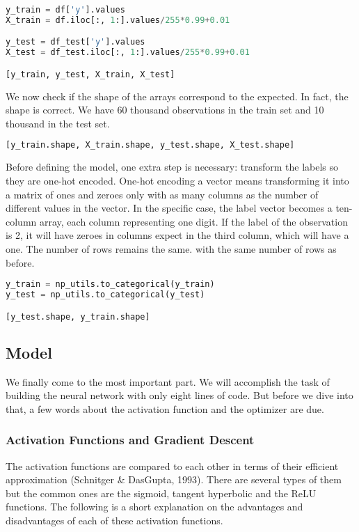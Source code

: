 \begin{lstlisting}[language=Python]
y_train = df['y'].values
X_train = df.iloc[:, 1:].values/255*0.99+0.01

y_test = df_test['y'].values
X_test = df_test.iloc[:, 1:].values/255*0.99+0.01

[y_train, y_test, X_train, X_test]
\end{lstlisting}

We now check if the shape of the arrays correspond to the expected. In fact, the shape is correct. We have 60 thousand observations in the train set and 10 thousand in the test set.

\begin{lstlisting}[language=Python]
[y_train.shape, X_train.shape, y_test.shape, X_test.shape]
\end{lstlisting}

Before defining the model, one extra step is necessary: transform the labels so they are one-hot encoded. One-hot encoding a vector means transforming it into a matrix of ones and zeroes only with as many columns as the number of different values in the vector. In the specific case, the label vector becomes a ten-column array, each column representing one digit. If the label of the observation is 2, it will have zeroes in columns expect in the third column, which will have a one. The number of rows remains the same. with the same number of rows as before.

\begin{lstlisting}[language=Python]
y_train = np_utils.to_categorical(y_train)
y_test = np_utils.to_categorical(y_test)

[y_test.shape, y_train.shape]
\end{lstlisting}

\subsection{Model}

We finally come to the most important part. We will accomplish the task of building the neural network with only eight lines of code. But before we dive into that, a few words about the activation function and the optimizer are due.

\subsubsection{Activation Functions and Gradient Descent}

The activation functions are compared to each other in terms of their efficient approximation (Schnitger & DasGupta, 1993). There are several types of them but the common ones are the sigmoid, tangent hyperbolic and the ReLU functions. The following is a short explanation on the advantages and disadvantages of each of these activation functions. 

